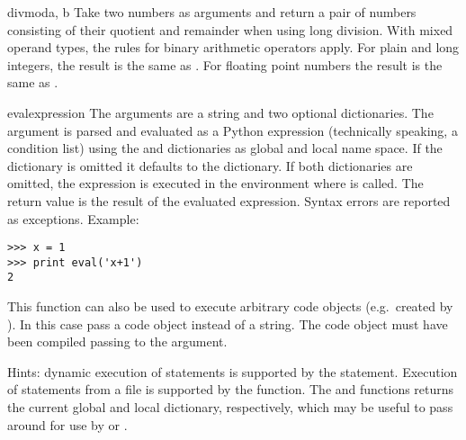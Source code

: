 \begin{funcdesc}{divmod}{a, b}
  Take two numbers as arguments and return a pair of numbers consisting
  of their quotient and remainder when using long division.  With mixed
  operand types, the rules for binary arithmetic operators apply.  For
  plain and long integers, the result is the same as
  .
  For floating point numbers the result is the same as
  .
\end{funcdesc}

\begin{funcdesc}{eval}{expression}
  The arguments are a string and two optional dictionaries.  The
   argument is parsed and evaluated as a Python
  expression (technically speaking, a condition list) using the
   and  dictionaries as global and local name
  space.  If the  dictionary is omitted it defaults to
  the  dictionary.  If both dictionaries are omitted, the
  expression is executed in the environment where  is
  called.  The return value is the result of the evaluated expression.
  Syntax errors are reported as exceptions.  Example:

\begin{verbatim}
>>> x = 1
>>> print eval('x+1')
2
\end{verbatim}

  This function can also be used to execute arbitrary code objects
  (e.g.\ created by ).  In this case pass a code
  object instead of a string.  The code object must have been compiled
  passing  to the  argument.

  Hints: dynamic execution of statements is supported by the
   statement.  Execution of statements from a file is
  supported by the  function.  The
   and  functions returns the
  current global and local dictionary, respectively, which may be
  useful to pass around for use by  or
  .
\end{funcdesc}

